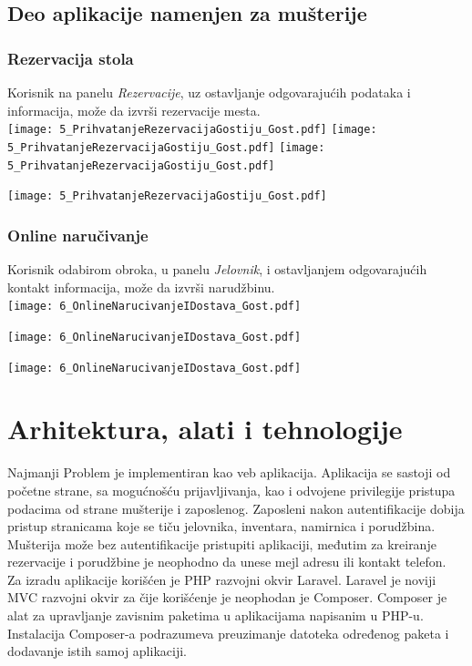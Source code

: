 \documentclass{article}
\begin{document}
\subsection{Deo aplikacije namenjen za mušterije}

\subsubsection{Rezervacija stola}
Korisnik na panelu \emph{Rezervacije}, uz ostavljanje odgovarajućih podataka i informacija, može da izvrši rezervacije mesta.\\

\texttt{[image: 5\_PrihvatanjeRezervacijaGostiju\_Gost.pdf]}
\vfill
\texttt{[image: 5\_PrihvatanjeRezervacijaGostiju\_Gost.pdf]}
\texttt{[image: 5\_PrihvatanjeRezervacijaGostiju\_Gost.pdf]}

\texttt{[image: 5\_PrihvatanjeRezervacijaGostiju\_Gost.pdf]}

\subsubsection{Online naručivanje}
Korisnik odabirom obroka, u panelu \emph{Jelovnik}, i ostavljanjem odgovarajućih kontakt informacija, može da izvrši narudžbinu.\\

\texttt{[image: 6\_OnlineNarucivanjeIDostava\_Gost.pdf]}

\texttt{[image: 6\_OnlineNarucivanjeIDostava\_Gost.pdf]}

\texttt{[image: 6\_OnlineNarucivanjeIDostava\_Gost.pdf]}

\section{Arhitektura, alati i tehnologije}


Najmanji Problem je implementiran kao veb aplikacija. Aplikacija se sastoji od početne strane, sa mogućnošću prijavljivanja, kao i odvojene privilegije pristupa podacima od strane mušterije i zaposlenog. Zaposleni nakon autentifikacije dobija pristup stranicama koje se tiču jelovnika, inventara, namirnica i porudžbina. Mušterija može bez autentifikacije pristupiti aplikaciji, međutim za kreiranje rezervacije i porudžbine je neophodno da unese mejl adresu ili kontakt telefon.\\

Za izradu aplikacije korišćen je PHP razvojni okvir Laravel. Laravel je noviji MVC razvojni okvir za čije korišćenje je neophodan je Composer. Composer je alat za upravljanje zavisnim paketima u aplikacijama napisanim u PHP-u. Instalacija Composer-a podrazumeva preuzimanje datoteka određenog paketa i dodavanje istih samoj aplikaciji.\\
\end{document}

